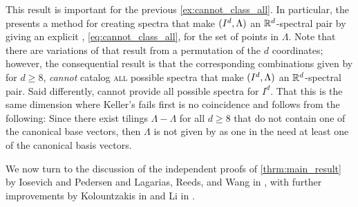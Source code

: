 \documentclass[../thesis.tex]{subfiles}
\begin{document}
This result is important for the previous \cref{ex:cannot_class_all}. In particular, the  presents a method for creating spectra that make $(I^d,\Lambda)$ an $\mathbb{R}^d$-spectral pair by giving an explicit , \cref{eq:cannot_class_all}, for the set of points in $\Lambda$. Note that there are variations of  that result from a permutation of the $d$ coordinates; however, the consequential result is that the corresponding combinations given by  for $d\geq8$, \emph{cannot} catalog \textsc{all} possible spectra that make $(I^d,\Lambda)$ an $\mathbb{R}^d$-spectral pair. Said differently,  cannot provide all possible spectra for $I^d$. That this is the same dimension where Keller's  fails first is no coincidence and follows from the following: Since there exist tilings $\Lambda-\Lambda$ for all $d\geq8$ that do not contain one of the canonical base vectors, then $\Lambda$ is  not given by  as one in the  need at least one of the canonical basis vectors.


We now turn to the discussion of the independent proofs of \cref{thrm:main_result} by Iosevich and Pedersen \cite{iosevichSpectralTilingProperties1998} and Lagarias, Reeds, and Wang in \cite{lagariasOrthonormalBasesExponentials2000}, with further improvements by Kolountzakis in \cite{kolountzakisPackingTilingOrthogonality2000} and Li in \cite{liCharacterizationsSpectraTilings2004}. 
\end{document}
